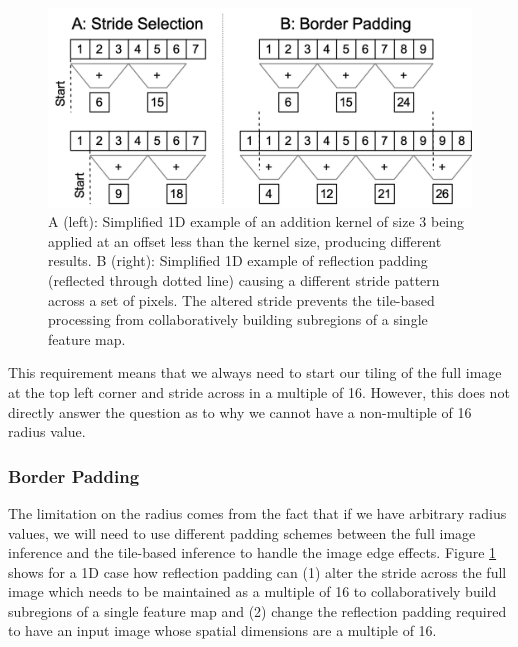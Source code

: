 \documentclass[letterpaper]{article} %
\begin{document}
\begin{figure}[h!]
	\centering
		\includegraphics[width=\linewidth]{figs/partitioning.png}
	\caption{A (left): Simplified 1D example of an addition kernel of size 3 being applied at an offset less than the kernel size, producing different results.
	B (right): Simplified 1D example of reflection padding (reflected through dotted line) causing a different stride pattern across a set of pixels. The altered stride prevents the tile-based processing from collaboratively building subregions of a single feature map.}
	\label{fig:offset}
\end{figure}

This requirement means that we always need to start our tiling of the full image at the top left corner and stride across in a multiple of 16. However, this does not directly answer the question as to why we cannot have a non-multiple of 16 radius value. 

\subsubsection{Border Padding}
The limitation on the radius comes from the fact that if we have arbitrary radius values, we will need to use different padding schemes between the full image inference and the tile-based inference to handle the image edge effects. Figure \ref{fig:offset} shows for a 1D case how reflection padding can (1) alter the stride across the full image which needs to be maintained as a multiple of 16 to collaboratively build subregions of a single feature map and (2) change the reflection padding required to have an input image whose spatial dimensions are a multiple of 16.

\end{document}
